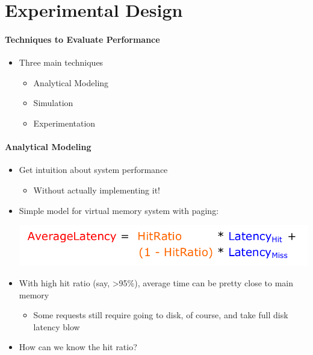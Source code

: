 \section{Experimental Design}

\paragraph{Techniques to Evaluate Performance}
\begin{itemize}
\item Three main techniques
  \begin{itemize}
  \item Analytical Modeling
  \item Simulation
  \item Experimentation
  \end{itemize}
\end{itemize}


\paragraph{Analytical Modeling}
\begin{itemize}
\item Get intuition about system performance
  \begin{itemize}
  \item Without actually implementing it!
  \end{itemize}

\item Simple model for virtual memory system with paging:

  \includegraphics[scale=0.15]{graphics/model-virtual-memory.png}

\item With high hit ratio (say, >95\%), average time can be
  pretty close to main memory
  \begin{itemize}
  \item Some requests still require going to disk, of course, and
    take full disk latency blow
  \end{itemize}

\item How can we know the hit ratio?
\end{itemize}


